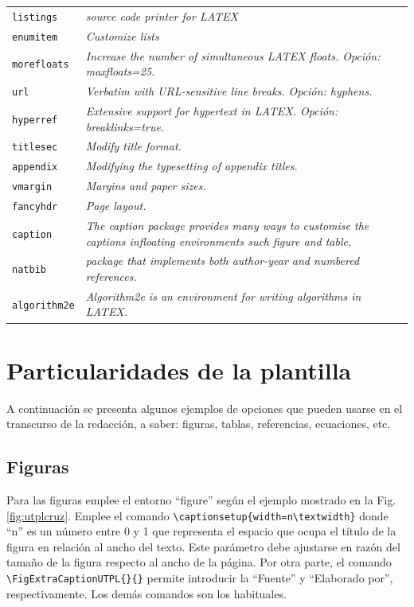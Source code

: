 \begin{longtable}{p{} p{}}
	\texttt{listings} 	& \textit{source code printer for LATEX }	 \\
	\texttt{enumitem} 	& \textit{Customize lists} \\
	\texttt{morefloats} & \textit{Increase the number of simultaneous LATEX floats. Opción: maxfloats=25.} \\
	\texttt{url} 		& \textit{Verbatim with URL-sensitive line breaks. Opción: hyphens.} \\
	\texttt{hyperref} 	& \textit{Extensive support for hypertext in LATEX. Opción: breaklinks=true.} \\
	\texttt{titlesec} 	& \textit{Modify title format.} \\
	\texttt{appendix}   & \textit{Modifying the typesetting of appendix titles.} \\
	\texttt{vmargin} 	& \textit{Margins and paper sizes.} \\
	\texttt{fancyhdr} 	& \textit{Page layout.}\\
	\texttt{caption} 	& \textit{The caption package provides many ways to customise the captions infloating environments such figure and table.}\\
	\texttt{natbib} 	& \textit{package that implements both author-year and numbered references.} \\
	\texttt{algorithm2e}& \textit{Algorithm2e is an environment for writing algorithms in LATEX.}
\end{longtable} 


\section{Particularidades de la plantilla}

A continuación se presenta algunos ejemplos de opciones que pueden usarse en el transcurso de la redacción, a saber: figuras, tablas, referencias, ecuaciones, etc. 

\subsection{Figuras}

Para las figuras emplee el entorno ``figure'' según el ejemplo mostrado en la Fig. \ref{fig:utplcruz}. Emplee el comando \lstinline|\captionsetup{width=n\textwidth}| donde ``n'' es un número entre 0 y 1 que representa el espacio que ocupa el título de la figura en relación al ancho del texto. Este parámetro debe ajustarse en razón del tamaño de la figura respecto al ancho de la página. Por otra parte, el comando \lstinline|\FigExtraCaptionUTPL{}{}| permite introducir la ``Fuente'' y ``Elaborado por'', respectivamente. Los demás comandos son los habituales. 

